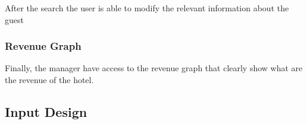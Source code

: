 After the search the user is able to modify the relevant information about the guest


\subsubsection{Revenue Graph}

Finally, the manager have access to the revenue graph that clearly show what are the revenue of the hotel.


\subsection{Input Design}

